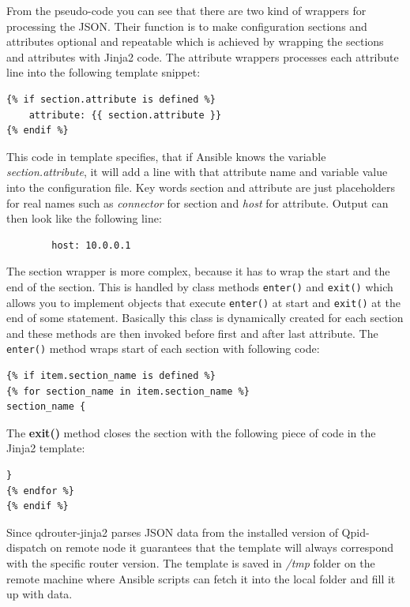 From the pseudo-code you can see that there are two kind of wrappers for processing the JSON. Their function is to make configuration sections and attributes optional and repeatable which is achieved by wrapping the sections and attributes with Jinja2 code. The attribute wrappers processes each attribute line into the following template snippet:

\begin{verbatim}
{% if section.attribute is defined %}
    attribute: {{ section.attribute }}
{% endif %}
\end{verbatim}

This code in template specifies, that if Ansible knows the variable \emph{section.attribute}, it will add a line with that attribute name and variable value into the configuration file. Key words section and attribute are just placeholders for real names such as \emph{connector} for section and \emph{host} for attribute. Output can then look like the following line:

\begin{verbatim}
		host: 10.0.0.1
\end{verbatim}

The section wrapper is more complex, because it has to wrap the start and the end of the section. This is handled by class methods \texttt{\textunderscore enter\textunderscore ()} and \texttt{\textunderscore exit\textunderscore ()} which allows you to implement objects that execute \texttt{\textunderscore enter\textunderscore ()} at start and \texttt{\textunderscore exit\textunderscore ()} at the end of some statement. Basically this class is dynamically created for each section and these methods are then invoked before first and after last attribute. The \texttt{\textunderscore enter\textunderscore ()} method wraps start of each section with following code:

\begin{verbatim}
{% if item.section_name is defined %}
{% for section_name in item.section_name %}
section_name {
\end{verbatim}

The \textbf{\textunderscore exit\textunderscore ()} method closes the section with the following piece of code in the Jinja2 template:
\begin{verbatim}
}
{% endfor %}
{% endif %}
\end{verbatim}

Since qdrouter-jinja2 parses JSON data from the installed version of Qpid-dispatch on remote node it guarantees that the template will always correspond with the specific router version. The template is saved in \emph{/tmp} folder on the remote machine where Ansible scripts can fetch it into the local folder and fill it up with data.

